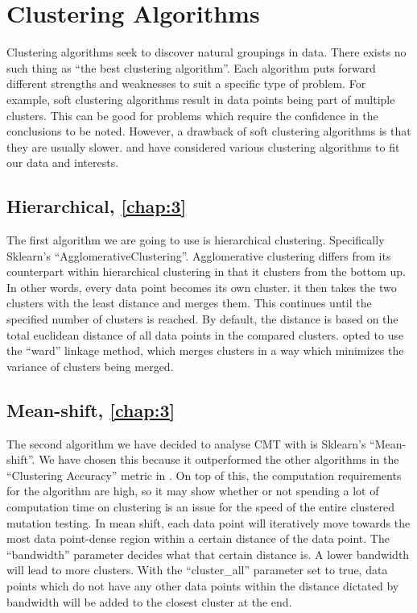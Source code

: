 \documentclass[twoside]{uva-inf-bachelor-thesis}
\begin{document}
\section{Clustering Algorithms}
Clustering algorithms seek to discover natural groupings in data. There exists no such thing as ``the best clustering algorithm''. Each algorithm puts forward different strengths and weaknesses to suit a specific type of problem. For example, soft clustering algorithms result in data points being part of multiple clusters. This can be good for problems which require the confidence in the conclusions to be noted. However, a drawback of soft clustering algorithms is that they are usually slower. \textcite{Basarat21} and \textcite{Mouissie22} have considered various clustering algorithms to fit our data and interests.

\subsection{Hierarchical, \textbf{\cref{chap:3}}}
The first algorithm we are going to use is hierarchical clustering. Specifically Sklearn's ``AgglomerativeClustering''. Agglomerative clustering differs from its counterpart within hierarchical clustering in that it clusters from the bottom up. In other words, every data point becomes its own cluster. it then takes the two clusters with the least distance and merges them. This continues until the specified number of clusters is reached. By default, the distance is based on the total euclidean distance of all data points in the compared clusters. \textcite{Basarat21}  opted to use the ``ward'' linkage method, which merges clusters in a way which minimizes the variance of clusters being merged.~\cite{agglomerativeClustering} 

\subsection{Mean-shift, \textbf{\cref{chap:3}}}
The second algorithm we have decided to analyse CMT with is Sklearn's ``Mean-shift''. We have chosen this because it outperformed the other algorithms in the ``Clustering Accuracy'' metric in \textcite{Mouissie22}. On top of this, the computation requirements for the algorithm are high, so it may show whether or not spending a lot of computation time on clustering is an issue for the speed of the entire clustered mutation testing. In mean shift, each data point will iteratively move towards the most data point-dense region within a certain distance of the data point. The ``bandwidth'' parameter decides what that certain distance is. A lower bandwidth will lead to more clusters. With the ``cluster\_all'' parameter set to true, data points which do not have any other data points within the distance dictated by bandwidth will be added to the closest cluster at the end.
\end{document}
